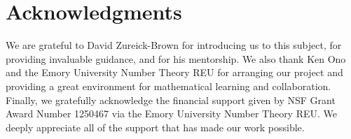 \documentclass{amsart}
\theoremstyle{plain}
\theoremstyle{definition}
\theoremstyle{remark}
\numberwithin{equation}{section}
\begin{document}
\section{Acknowledgments}
\label{sec:ack}
We are grateful to David Zureick-Brown for introducing us to this
subject, for providing invaluable guidance,
and for his mentorship. We also thank Ken Ono and the
Emory University Number Theory REU for arranging our project and
providing a great environment for mathematical learning and
collaboration.
Finally, we gratefully acknowledge the financial support given by
NSF Grant Award Number 1250467 via the Emory University Number
Theory REU. We deeply appreciate all of the support that has made
our work possible.


\nocite{*}
{}

\end{document}
